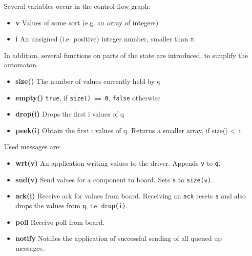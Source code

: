 \documentclass{report}
\begin{document}
Several variables occur in the control flow graph:
\begin{itemize} \itemsep1pt \parskip0pt 
\item \textbf{v} Values of some sort (e.g. an array of integers)
\item \textbf{i} An unsigned (i.e. positive) integer number, smaller than \texttt{n}
\end{itemize}

In addition, several functions on parts of the state are introduced, to simplify the automaton.
\begin{itemize} \itemsep1pt \parskip0pt 
\item \textbf{size()} The number of values currently held by q
\item \textbf{empty()} \texttt{true}, if \texttt{size() == 0}, \texttt{false} otherwise
\item \textbf{drop(i)} Drops the first i values of q
\item \textbf{peek(i)} Obtain the first i values of q. Returns a smaller array, if size() \textless ~i
\end{itemize}

Used messages are:
\begin{itemize} \itemsep1pt \parskip0pt 
\item \textbf{wrt(v)} An application writing values to the driver. Appends \texttt{v} to \texttt{q}.
\item \textbf{snd(v)} Send values for a component to board. Sets \texttt{s} to \texttt{size(v)}.
\item \textbf{ack(i)} Receive ack for values from board. Receiving an \texttt{ack} resets \texttt{s} and also drops the values from \texttt{q}, i.e. \texttt{drop(i)}.
\item \textbf{poll} Receive poll from board.
\item \textbf{notify} Notifies the application of successful sending of all queued up messages.
\end{itemize}
\end{document}

